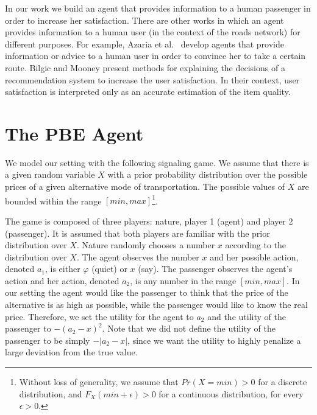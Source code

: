 \documentclass[letterpaper]{article} %
\begin{document}
In our work we build an agent that provides information to a human passenger in order to increase her satisfaction. There are other works in which an agent provides information to a human user (in the context of the roads network) for different purposes. For example, Azaria et al.~ develop agents that provide information or advice to a human user in order to convince her to take a certain route. Bilgic and Mooney \cite{bilgic2005explaining} present methods for explaining the decisions of a recommendation system to increase the user satisfaction. In their context, user satisfaction is interpreted only as an accurate estimation of the item quality.



\section{The PBE Agent}

We model our setting with the following signaling game.
We assume that there is a given random variable $X$ with a prior probability distribution over the possible prices of a given alternative mode of transportation. The possible values of $X$ are bounded within the range $[min,max]$\footnote{Without loss of generality, we assume that $Pr(X=min)>0$ for a discrete distribution, and $F_X(min+\epsilon)>0$ for a continuous distribution, for every $\epsilon > 0$.}. 

The game is composed of three players: nature, player 1 (agent) and player 2 (passenger). It is assumed that both players are familiar with the prior distribution over $X$.
Nature randomly chooses a number $x$ according to the distribution over $X$.
The agent observes the number $x$ and her possible action, denoted $a_1$, is either  $\varphi$ (quiet) or $x$ (say). 
The passenger observes the agent's action and her action, denoted $a_2$, is any number in the range $[min,max]$.
In our setting the agent would like the passenger to think that the price of the alternative is as high as possible, while the passenger would like to know the real price. Therefore, we set the utility for the agent to $a_2$ and the utility of the passenger to $-(a_2-x)^2$. Note that we did not define the utility of the passenger to be simply $-|a_2-x|$, since we want the utility to highly penalize a large deviation from the true value.
\end{document}
